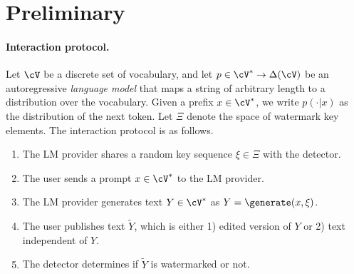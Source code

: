 \section{Preliminary}
\label{sec:prelim}
%
\paragraph{Interaction protocol.}
Let $\cV$ be a discrete set of vocabulary, and let $p \in \cV^* \rightarrow \Delta(\cV)$ be an autoregressive \emph{language model} that maps a string of arbitrary length to a distribution over the vocabulary. Given a prefix $x \in \cV^*$, we write $p(\cdot | x)$ as the distribution of the next token. Let $\Xi$ denote the space of watermark key elements. The interaction protocol is as follows. 
%
\begin{enumerate}
    \item The LM provider shares a random key sequence $\xi \in \Xi$ with the detector. 
    \item The user sends a prompt $x \in \cV^*$ to the LM provider.
    \item The LM provider generates text $Y \in \cV^*$ as $Y = \generate(x, \xi)$. 
    \item The user publishes text $\widetilde{Y}$, which is either 1) edited version of $Y$ or 2) text independent of $Y$. 
    \item The detector determines if $\widetilde{Y}$ is watermarked or not.
\end{enumerate}
%

